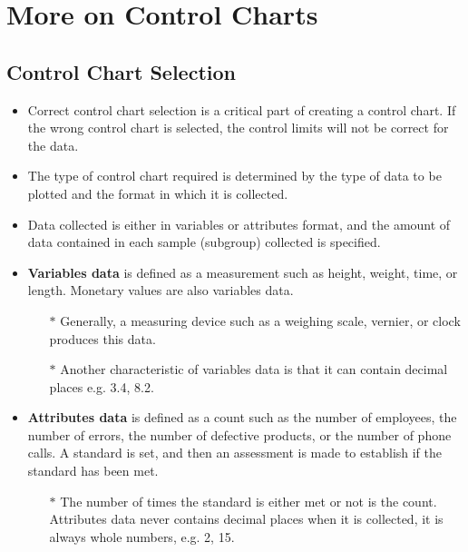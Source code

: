 \documentclass[]{article}
\begin{document}
\newpage
\section{More on Control Charts}

\subsection{Control Chart Selection}
\begin{itemize}
\item Correct control chart selection is a critical part of creating a control chart. If the wrong control chart is selected, the control limits will not be correct for the data. 
\item The type of control chart required is determined by the type of data to be plotted and the format in which it is collected. \item Data collected is either in variables or attributes format, and the amount of data contained in each sample (subgroup) collected is specified.

\item \textbf{Variables data} is defined as a measurement such as height, weight, time, or length. Monetary values are also variables data. 
\begin{itemize}
\item[$\ast$] Generally, a measuring device such as a weighing scale, vernier, or clock produces this data. \item[$\ast$] Another characteristic of variables data is that it can contain decimal places e.g. 3.4, 8.2.
\end{itemize}

\item \textbf{Attributes data} is defined as a count such as the number of employees, the number of errors, the number of defective products, or the number of phone calls. A standard is set, and then an assessment is made to establish if the standard has been met. 
\begin{itemize}
\item[$\ast$] The number of times the standard is either met or not is the count. Attributes data never contains decimal places when it is collected, it is always whole numbers, e.g. 2, 15.
\end{itemize}
\end{itemize}

\newpage
\end{document}
